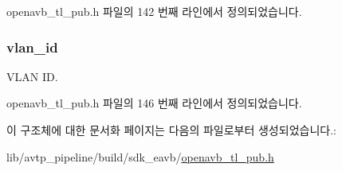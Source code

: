 openavb\+\_\+tl\+\_\+pub.\+h 파일의 142 번째 라인에서 정의되었습니다.

\subsubsection[{\texorpdfstring{vlan\+\_\+id}{vlan_id}}]{ vlan\+\_\+id}\hypertarget{structopenavb__tl__cfg__t_a1b24465e054a200402c04340ccc56eae}{}\label{structopenavb__tl__cfg__t_a1b24465e054a200402c04340ccc56eae}


V\+L\+AN ID. 



openavb\+\_\+tl\+\_\+pub.\+h 파일의 146 번째 라인에서 정의되었습니다.



이 구조체에 대한 문서화 페이지는 다음의 파일로부터 생성되었습니다.\+:\begin{DoxyCompactItemize}
\item 
lib/avtp\+\_\+pipeline/build/sdk\+\_\+eavb/\hyperlink{build_2sdk__eavb_2openavb__tl__pub_8h}{openavb\+\_\+tl\+\_\+pub.\+h}\end{DoxyCompactItemize}

